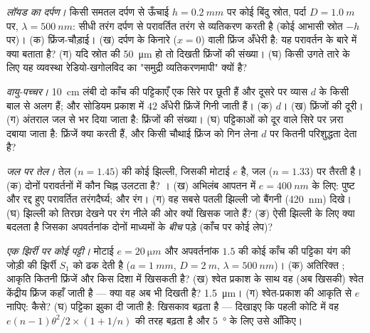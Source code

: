 \begin{exercise}[$\star\star$]\label{exo:b2:two-wave-interference:7}
\emph{लॉयड का दर्पण।} किसी समतल दर्पण से ऊँचाई $h = \qty{0.2}{mm}$ पर कोई
बिंदु स्रोत, पर्दा $D = \qty{1.0}{m}$ पर, $\lambda = \qty{500}{nm}$: सीधी तरंग
दर्पण से परावर्तित तरंग से व्यतिकरण करती है (कोई आभासी स्रोत
$-h$ पर)। (क) फ्रिंज-चौड़ाई। (ख) दर्पण के किनारे ($x = 0$) वाली फ्रिंज
अँधेरी है: यह परावर्तन के बारे में क्या बताता है? (ग) यदि स्रोत की  \qty{50}{\micro m} हो तो दिखती फ्रिंजों की संख्या। (घ) किसी उगते तारे के लिए
यह व्यवस्था रेडियो-खगोलविद का "समुद्री व्यतिकरणमापी" क्यों है?
\end{exercise}

\begin{exercise}[$\star\star$]\label{exo:b2:two-wave-interference:8}
\emph{वायु-पच्चर।} \qty{10}{cm} लंबी दो काँच की पट्टिकाएँ एक सिरे पर छूती हैं और
दूसरे पर व्यास $d$ के किसी बाल से अलग हैं; और सोडियम प्रकाश में
$42$ अँधेरी फ्रिंजें गिनी जाती हैं। (क) $d$। (ख) फ्रिंजों की दूरी। (ग) अंतराल
जल से भर दिया जाता है: फ्रिंजों की संख्या। (घ) पट्टिकाओं को दूर वाले सिरे पर
ज़रा दबाया जाता है: फ्रिंजें क्या करती हैं, और किसी चौथाई फ्रिंज को गिन लेना
$d$ पर कितनी परिशुद्धता देता है?
\end{exercise}

\begin{exercise}[$\star\star$]\label{exo:b2:two-wave-interference:9}
\emph{जल पर तेल।} तेल ($n = 1.45$) की कोई झिल्ली, जिसकी मोटाई $e$ है, जल
($n = 1.33$) पर तैरती है। (क) दोनों परावर्तनों में कौन चिह्न उलटता
है? । (ख) अभिलंब आपतन में $e = \qty{400}{nm}$ के लिए:
पुष्ट और रद्द हुए परावर्तित तरंगदैर्घ्य; और रंग। (ग) वह सबसे पतली
झिल्ली जो बैंगनी (\qty{420}{nm}) दिखे। (घ) झिल्ली को तिरछा देखने पर रंग नीले की ओर
क्यों खिसक जाते हैं? (ङ) ऐसी झिल्ली के लिए क्या बदलता है जिसका अपवर्तनांक
दोनों माध्यमों के \emph{बीच} पड़े (काँच पर कोई लेप)?
\end{exercise}

\begin{exercise}[$\star\star\star$]\label{exo:b2:two-wave-interference:10}
\emph{एक झिर्री पर कोई पट्टी।} मोटाई $e = \qty{20}{\micro m}$ और अपवर्तनांक
$1.5$ की कोई काँच की पट्टिका यंग की जोड़ी की झिर्री $S_1$ को ढक देती है
($a = \qty{1}{mm}$, $D =
\qty{2}{m}$, $\lambda = \qty{500}{nm}$)। (क) अतिरिक्त ;
आकृति कितनी फ्रिंजें और किस दिशा में खिसकती है? (ख) श्वेत प्रकाश के साथ
वह (अब खिसकी) श्वेत केंद्रीय फ्रिंज कहाँ जाती है --- क्या वह अब भी
दिखती है?  \qty{1.5}{\micro m}। (ग) श्वेत-प्रकाश की
आकृति से $e$ नापिए: कैसे? (घ) पट्टिका झुका दी जाती है: खिसकाव बढ़ता है
--- दिखाइए कि पहली कोटि में वह $e(n - 1)\theta^2/2 \times (1 + 1/n)$ की तरह बढ़ता है
और \qty{5}{\degree} के लिए उसे आँकिए।
\end{exercise}

